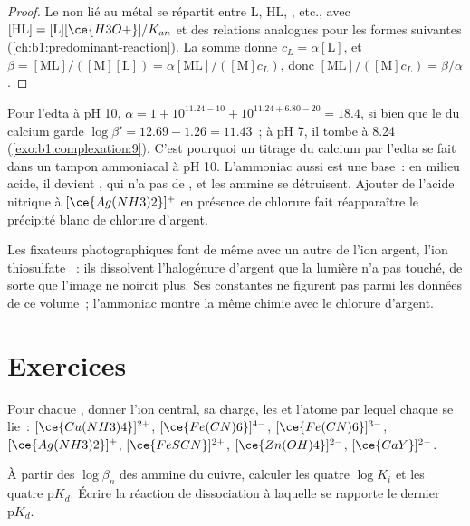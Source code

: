 \begin{proof}
Le  non lié au métal se répartit entre L, HL, , etc., avec
$[\mathrm{HL}] = [\mathrm{L}][\ce{H3O+}]/K_{an}$ et des relations
analogues pour les formes suivantes (\cref{ch:b1:predominant-reaction}).
La somme donne $c_L = \alpha[\mathrm{L}]$,
et $\beta = [\mathrm{ML}]/([\mathrm{M}][\mathrm{L}]) =
\alpha[\mathrm{ML}]/([\mathrm{M}]c_L)$, donc $[\mathrm{ML}]/([\mathrm{M}]c_L)
= \beta/\alpha$.
\end{proof}

Pour l'edta à pH 10, $\alpha = 1 + 10^{11.24 - 10} + 10^{11.24 + 6.80 - 20}
= 18.4$, si bien que le  du calcium garde
$\log\beta' = 12.69 - 1.26 = 11.43$~;
à pH 7, il tombe à 8.24 (\cref{exo:b1:complexation:9}). C'est pourquoi
un titrage du calcium par l'edta se fait dans un tampon ammoniacal à
pH 10. L'ammoniac aussi est une base~: en milieu acide, il devient
, qui n'a pas de , et les  ammine se
détruisent. Ajouter de l'acide nitrique à $[\ce{Ag(NH3)2}]^{+}$ en
présence de chlorure fait réapparaître le précipité blanc de chlorure
d'argent.

Les fixateurs photographiques font de même avec un autre  de l'ion
argent, l'ion thiosulfate ~: ils dissolvent l'halogénure
d'argent que la lumière n'a pas touché, de sorte que l'image ne noircit
plus. Ses constantes ne figurent pas parmi les données de ce volume~;
l'ammoniac montre la même chimie avec le chlorure d'argent.

\section{Exercices}

\begin{exercise}[$\star$]\label{exo:b1:complexation:1}
Pour chaque , donner l'ion central, sa charge, les  et
l'atome par lequel chaque  se lie~: $[\ce{Cu(NH3)4}]^{2+}$,
$[\ce{Fe(CN)6}]^{4-}$, $[\ce{Fe(CN)6}]^{3-}$, $[\ce{Ag(NH3)2}]^{+}$,
$[\ce{FeSCN}]^{2+}$, $[\ce{Zn(OH)4}]^{2-}$, $[\ce{CaY}]^{2-}$.
\end{exercise}

\begin{exercise}[$\star$]\label{exo:b1:complexation:2}
À partir des $\log\beta_n$ des  ammine du cuivre, calculer les
quatre $\log K_i$ et les quatre $\mathrm{p}K_d$. Écrire la réaction de
dissociation à laquelle se rapporte le dernier $\mathrm{p}K_d$.
\end{exercise}

